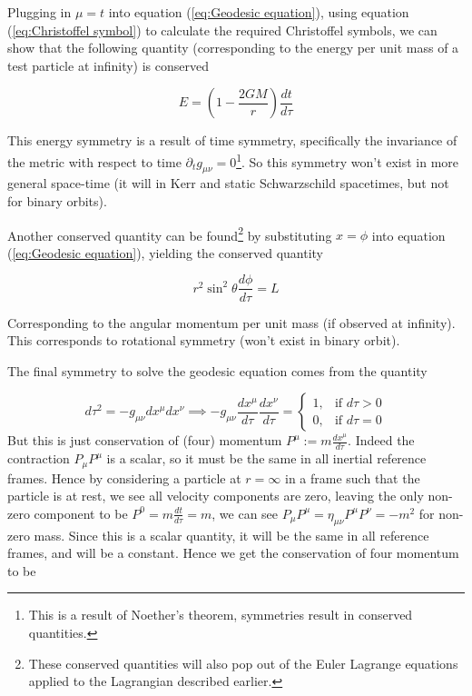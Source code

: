 \documentclass{article}
\begin{document}
Plugging in $\mu=t$ into equation (\ref{eq:Geodesic equation}), using equation (\ref{eq:Christoffel symbol}) to calculate the required Christoffel symbols, we can show that the following quantity (corresponding to the energy per unit mass of a test particle at infinity) is conserved

\begin{equation}
    E = (1-\frac{2 G M}{r}) \frac{dt}{d\tau}
\label{eq:Energy conservation}
\end{equation}

This energy symmetry is a result of time symmetry, specifically the invariance of the metric with respect to time $\partial_t g_{\mu \nu} = 0$\footnote{This is a result of Noether's theorem, symmetries result in conserved quantities.}. So this symmetry won't exist in more general space-time (it will in Kerr and static Schwarzschild spacetimes, but not for binary orbits).

Another conserved quantity can be found\footnote{These conserved quantities will also pop out of the Euler Lagrange equations applied to the Lagrangian described earlier.} by substituting $x=\phi$ into equation (\ref{eq:Geodesic equation}), yielding the conserved quantity

\begin{equation}
    r^2 \sin^2\theta \frac{d\phi}{d\tau} = L
\end{equation}

Corresponding to the angular momentum per unit mass (if observed at infinity). This corresponds to rotational symmetry (won't exist in binary orbit).

The final symmetry to solve the geodesic equation comes from the quantity

\begin{equation}
    d\tau^2 = - g_{\mu \nu} dx^{\mu} dx^{\nu}\implies
    - g_{\mu \nu} \frac{dx^{\mu}}{d\tau} \frac{dx^{\nu}}{d\tau} = 
    \begin{cases}
        1,& \text{if } d\tau > 0\\
        0,              & \text{if } d\tau = 0
    \end{cases}
\end{equation}
But this is just conservation of (four) momentum $P^\mu:=m \frac{dx^\mu}{d\tau}$. Indeed the contraction $P_\mu P^\mu $ is a scalar, so it must be the same in all inertial reference frames. Hence by considering a particle at $r=\infty$ in a frame such that the particle is at rest, we see all velocity components are zero, leaving the only non-zero component to be $P^0=m \frac{dt}{d\tau}=m$, we can see $P_\mu P^\mu = \eta_{\mu \nu} P^\mu P^\nu = -m^2$ for non-zero mass. Since this is a scalar quantity, it will be the same in all reference frames, and will be a constant. Hence we get the conservation of four momentum to be
\end{document}
